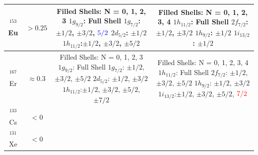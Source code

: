 \documentclass[8pt,a4paper, twoside]{report}
\begin{document}
\begin{table}[htbp]
\begin{tabular}{c|c|c|c}
\midrule
$^{153}$Eu & $> 0.25$
    &  \pbox{20cm}{Filled Shells: N = 0, 1, 2, 3 \\
    $1g_{9/2}$: Full Shell \\
    $1g_{7/2}$: $\pm 1/2$, $\pm 3/2$, $\textcolor{blue}{5/2}$ \\
    $2d_{5/2}$: $\pm 1/2$ \\ 
    $1h_{11/2}$:$\pm 1/2$, $\pm 3/2$, $\pm 5/2$}          
    &  \pbox{20cm}{Filled Shells: N = 0, 1, 2, 3, 4 \\
    $1h_{11/2}$: Full Shell \\
    $2f_{7/2}$:$\pm 1/2$, $\pm 3/2$ \\
    $1h_{9/2}$: $\pm 1/2$ \\
    $1i_{13/2}$: $\pm 1/2$} \\
\midrule
$^{167}$Er & $\approx 0.3$          
    &  \pbox{20cm}{Filled Shells: N = 0, 1, 2, 3 \\
    $1g_{9/2}$: Full Shell \\
    $1g_{7/2}$: $\pm 1/2$, $\pm 3/2$, $\pm 5/2$\\
    $2d_{5/2}$: $\pm 1/2$, $\pm 3/2$ \\
    $1h_{11/2}$:$\pm 1/2$, $\pm 3/2$, $\pm 5/2$, $\pm 7/2$ }              
    &  \pbox{20cm}{Filled Shells: N = 0, 1, 2, 3, 4 \\
    $1h_{11/2}$: Full Shell \\
    $2f_{7/2}$: $\pm 1/2$, $\pm 3/2$, $\pm 5/2$ \\
    $1h_{9/2}$: $\pm 1/2$, $\pm 3/2$ \\
    $1i_{13/2}$:$\pm 1/2$, $\pm 3/2$, $\pm 5/2$, $\textcolor{red}{7/2}$} \\
\midrule
$^{133}$Cs & $< 0$                  &         & \\
$^{131}$Xe & $< 0$                  &         & \\
\bottomrule
\bottomrule
\end{tabular}
\end{table}

\listoffigures
\listoftables



\end{document}
